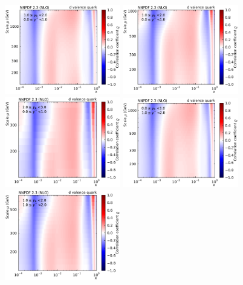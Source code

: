 \begin{figure}[htbp]
    \centering
    \includegraphics[width=0.45\textwidth]{figures/pdf_constraints/corr_PTMAXEXPYS_YBYS_NLO_FINALBINS_NNPDF23_d_valence_quark_ys0_0yb0_0_cl.pdf}\hfill
    \includegraphics[width=0.45\textwidth]{figures/pdf_constraints/corr_PTMAXEXPYS_YBYS_NLO_FINALBINS_NNPDF23_d_valence_quark_ys0_0yb1_0_cl.pdf}\hfill
    \includegraphics[width=0.45\textwidth]{figures/pdf_constraints/corr_PTMAXEXPYS_YBYS_NLO_FINALBINS_NNPDF23_d_valence_quark_ys0_0yb2_0_cl.pdf}\hfill
    \includegraphics[width=0.45\textwidth]{figures/pdf_constraints/corr_PTMAXEXPYS_YBYS_NLO_FINALBINS_NNPDF23_d_valence_quark_ys1_0yb0_0_cl.pdf}\hfill
    \includegraphics[width=0.45\textwidth]{figures/pdf_constraints/corr_PTMAXEXPYS_YBYS_NLO_FINALBINS_NNPDF23_d_valence_quark_ys1_0yb1_0_cl.pdf}\hfill

\end{figure}
